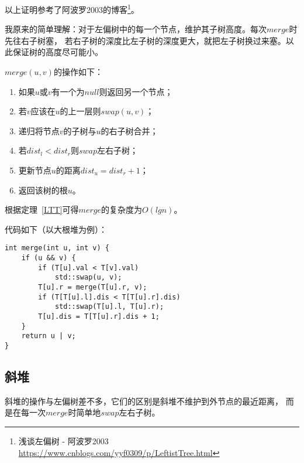 以上证明参考了阿波罗2003的博客\footnote{
    浅谈左偏树 - 阿波罗2003
    \url{https://www.cnblogs.com/yyf0309/p/LeftistTree.html}
}。

我原来的简单理解：对于左偏树中的每一个节点，维护其子树高度。每次$merge$时先往右子树塞，
若右子树的深度比左子树的深度更大，就把左子树换过来塞。以此保证树的高度尽可能小。

$merge(u,v)$的操作如下：

\begin{enumerate}
    \item 如果$u$或$v$有一个为$null$则返回另一个节点；
    \item 若$v$应该在$u$的上一层则$swap(u,v)$；
    \item 递归将节点$v$的子树与$u$的右子树合并；
    \item 若$dist_l<dist_r$则$swap$左右子树；
    \item 更新节点$u$的距离$dist_u=dist_r+1$；
    \item 返回该树的根$u$。
\end{enumerate}

根据定理~\ref{LTT}可得$merge$的复杂度为$O(lgn)$。

代码如下（以大根堆为例）：

\begin{lstlisting}[title=merge]
int merge(int u, int v) {
    if (u && v) {
        if (T[u].val < T[v].val)
            std::swap(u, v);
        T[u].r = merge(T[u].r, v);
        if (T[T[u].l].dis < T[T[u].r].dis)
            std::swap(T[u].l, T[u].r);
        T[u].dis = T[T[u].r].dis + 1;
    }
    return u | v;
}
\end{lstlisting}

\subsection{斜堆}
斜堆的操作与左偏树差不多，它们的区别是斜堆不维护到外节点的最近距离，
而是在每一次$merge$时简单地$swap$左右子树。
